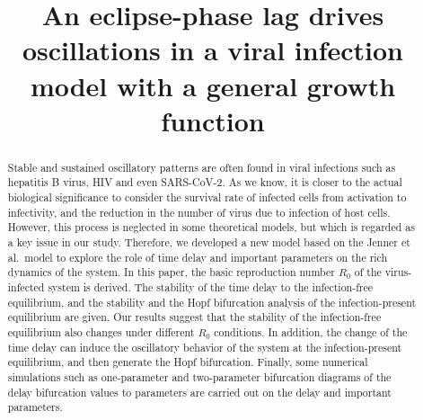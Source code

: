 \documentclass{CMHPhD-SIVD}
\begin{document}



\title{
  An eclipse-phase lag drives oscillations in a viral infection model with a general growth function}

\author{
}

\maketitle

\begin{abstract} %
	Stable and sustained oscillatory patterns are often found in viral infections such as hepatitis B virus, HIV and even SARS-CoV-2. As we know, it is closer to the actual biological significance to consider the survival rate of infected cells from activation to infectivity, and the reduction in the number of virus due to infection of host cells. However, this process is neglected in some theoretical models, but which is regarded as a key issue in our study. Therefore, we developed a new model based on the Jenner et al.\ model to explore the role of time delay and important parameters on the rich dynamics of the system. In this paper, the basic reproduction number $R_0$ of the virus-infected system is derived. The stability of the time delay to the infection-free equilibrium, and the stability and the Hopf bifurcation analysis of the infection-present equilibrium are given. Our results suggest that the stability of the  infection-free equilibrium also changes under different $R_0$ conditions. In addition, the change of the time delay can induce the oscillatory behavior of the system at the infection-present equilibrium, and then generate the Hopf bifurcation. Finally, some numerical simulations such as one-parameter and two-parameter bifurcation diagrams of the delay bifurcation values to parameters are carried out on the delay and important parameters.
\end{abstract}
\end{document}
